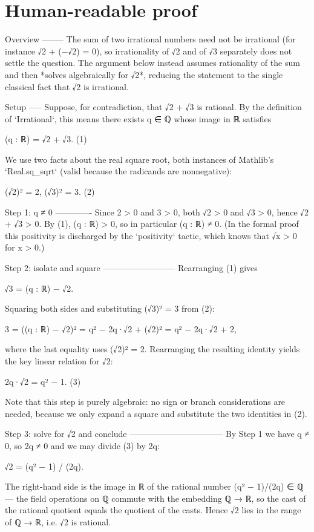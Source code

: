 \documentclass[11pt]{article}
\begin{document}
\section*{Human-readable proof}
Overview
--------
The sum of two irrational numbers need not be irrational (for instance √2 + (−√2) = 0), so irrationality of √2 and of √3 separately does not settle the question. The argument below instead assumes rationality of the sum and then *solves algebraically for √2*, reducing the statement to the single classical fact that √2 is irrational.

Setup
-----
Suppose, for contradiction, that √2 + √3 is rational. By the definition of `Irrational`, this means there exists q ∈ ℚ whose image in ℝ satisfies

    (q : ℝ) = √2 + √3.                                          (1)

We use two facts about the real square root, both instances of Mathlib's `Real.sq\_sqrt` (valid because the radicands are nonnegative):

    (√2)² = 2,        (√3)² = 3.                                 (2)

Step 1: q ≠ 0
-------------
Since 2 > 0 and 3 > 0, both √2 > 0 and √3 > 0, hence √2 + √3 > 0. By (1), (q : ℝ) > 0, so in particular (q : ℝ) ≠ 0. (In the formal proof this positivity is discharged by the `positivity` tactic, which knows that √x > 0 for x > 0.)

Step 2: isolate and square
--------------------------
Rearranging (1) gives

    √3 = (q : ℝ) − √2.

Squaring both sides and substituting (√3)² = 3 from (2):

    3 = ((q : ℝ) − √2)² = q² − 2q·√2 + (√2)² = q² − 2q·√2 + 2,

where the last equality uses (√2)² = 2. Rearranging the resulting identity yields the key linear relation for √2:

    2q·√2 = q² − 1.                                              (3)

Note that this step is purely algebraic: no sign or branch considerations are needed, because we only expand a square and substitute the two identities in (2).

Step 3: solve for √2 and conclude
---------------------------------
By Step 1 we have q ≠ 0, so 2q ≠ 0 and we may divide (3) by 2q:

    √2 = (q² − 1) / (2q).

The right-hand side is the image in ℝ of the rational number (q² − 1)/(2q) ∈ ℚ — the field operations on ℚ commute with the embedding ℚ → ℝ, so the cast of the rational quotient equals the quotient of the casts. Hence √2 lies in the range of ℚ → ℝ, i.e. √2 is rational.
\end{document}
